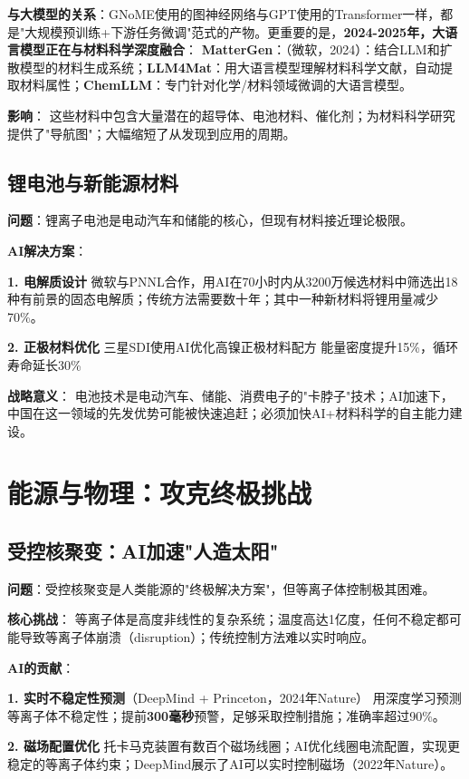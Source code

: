 \textbf{与大模型的关系}：GNoME使用的图神经网络与GPT使用的Transformer一样，都是"大规模预训练+下游任务微调"范式的产物。更重要的是，\textbf{2024-2025年，大语言模型正在与材料科学深度融合}：
\textbf{MatterGen}：（微软，2024）：结合LLM和扩散模型的材料生成系统；\textbf{LLM4Mat}：用大语言模型理解材料科学文献，自动提取材料属性；\textbf{ChemLLM}：专门针对化学/材料领域微调的大语言模型。

\textbf{影响}：
这些材料中包含大量潜在的超导体、电池材料、催化剂；为材料科学研究提供了"导航图"；大幅缩短了从发现到应用的周期。

\subsection{锂电池与新能源材料}

\textbf{问题}：锂离子电池是电动汽车和储能的核心，但现有材料接近理论极限。

\textbf{AI解决方案}：

\textbf{1. 电解质设计}
微软与PNNL合作，用AI在70小时内从3200万候选材料中筛选出18种有前景的固态电解质；传统方法需要数十年；其中一种新材料将锂用量减少70\%。

\textbf{2. 正极材料优化}
三星SDI使用AI优化高镍正极材料配方 能量密度提升15\%，循环寿命延长30\%

\textbf{战略意义}：
电池技术是电动汽车、储能、消费电子的"卡脖子"技术；AI加速下，中国在这一领域的先发优势可能被快速追赶；必须加快AI+材料科学的自主能力建设。

\section{能源与物理：攻克终极挑战}

\subsection{受控核聚变：AI加速"人造太阳"}

\textbf{问题}：受控核聚变是人类能源的"终极解决方案"，但等离子体控制极其困难。

\textbf{核心挑战}：
等离子体是高度非线性的复杂系统；温度高达1亿度，任何不稳定都可能导致等离子体崩溃（disruption）；传统控制方法难以实时响应。

\textbf{AI的贡献}：

\textbf{1. 实时不稳定性预测}（DeepMind + Princeton，2024年Nature）
用深度学习预测等离子体不稳定性；提前\textbf{300毫秒}预警，足够采取控制措施；准确率超过90\%。

\textbf{2. 磁场配置优化}
托卡马克装置有数百个磁场线圈；AI优化线圈电流配置，实现更稳定的等离子体约束；DeepMind展示了AI可以实时控制磁场（2022年Nature）。

